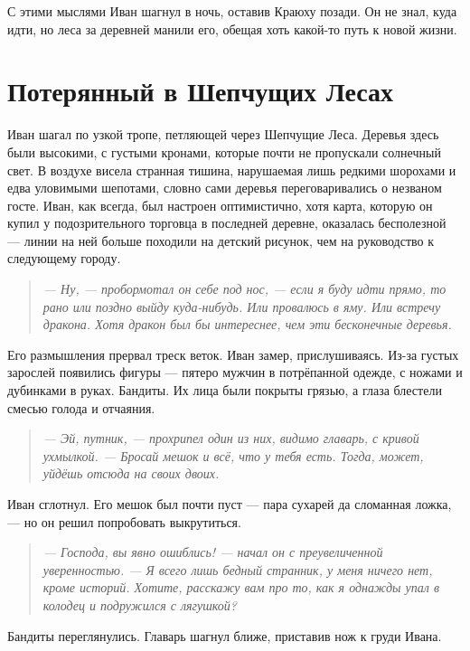 \documentclass[12pt,a4paper]{book}
\newenvironment{dialogue}{\begin{quote}\itshape}{\end{quote}}
\begin{document}
С этими мыслями Иван шагнул в ночь, оставив Краюху позади. Он не знал, куда идти, но леса за деревней манили его, обещая хоть какой-то путь к новой жизни.

\chapter{Потерянный в Шепчущих Лесах}

Иван шагал по узкой тропе, петляющей через Шепчущие Леса. Деревья здесь были высокими, с густыми кронами, которые почти не пропускали солнечный свет. В воздухе висела странная тишина, нарушаемая лишь редкими шорохами и едва уловимыми шепотами, словно сами деревья переговаривались о незваном госте. Иван, как всегда, был настроен оптимистично, хотя карта, которую он купил у подозрительного торговца в последней деревне, оказалась бесполезной --- линии на ней больше походили на детский рисунок, чем на руководство к следующему городу.

\begin{dialogue}
--- Ну, --- пробормотал он себе под нос, --- если я буду идти прямо, то рано или поздно выйду куда-нибудь. Или провалюсь в яму. Или встречу дракона. Хотя дракон был бы интереснее, чем эти бесконечные деревья.
\end{dialogue}

Его размышления прервал треск веток. Иван замер, прислушиваясь. Из-за густых зарослей появились фигуры --- пятеро мужчин в потрёпанной одежде, с ножами и дубинками в руках. Бандиты. Их лица были покрыты грязью, а глаза блестели смесью голода и отчаяния.

\begin{dialogue}
--- Эй, путник, --- прохрипел один из них, видимо главарь, с кривой ухмылкой. --- Бросай мешок и всё, что у тебя есть. Тогда, может, уйдёшь отсюда на своих двоих.
\end{dialogue}

Иван сглотнул. Его мешок был почти пуст --- пара сухарей да сломанная ложка, --- но он решил попробовать выкрутиться.

\begin{dialogue}
--- Господа, вы явно ошиблись! --- начал он с преувеличенной уверенностью. --- Я всего лишь бедный странник, у меня ничего нет, кроме историй. Хотите, расскажу вам про то, как я однажды упал в колодец и подружился с лягушкой?
\end{dialogue}

Бандиты переглянулись. Главарь шагнул ближе, приставив нож к груди Ивана.
\end{document}
